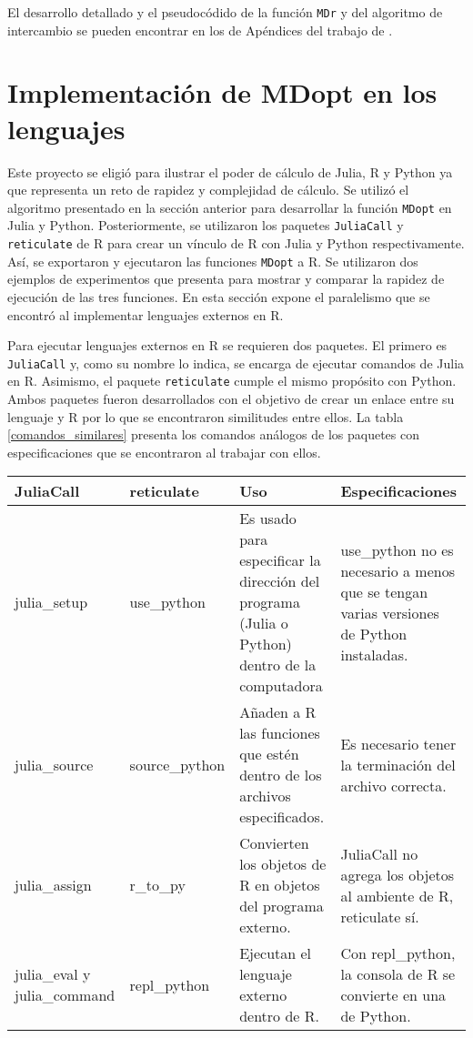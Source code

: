 El desarrollo detallado y el pseudocódido de la función \texttt{MDr} y del algoritmo de intercambio se pueden encontrar en los de Apéndices del trabajo de \cite{tesis_paty}.  

\section{Implementación de MDopt en los lenguajes}

Este proyecto se eligió para ilustrar el poder de cálculo de \textsf{Julia, R} y \textsf{Python} ya que representa un reto de rapidez y complejidad de cálculo. Se utilizó el algoritmo presentado en la sección anterior para desarrollar la función \texttt{MDopt} en \textsf{Julia} y \textsf{Python}. Posteriormente, se utilizaron los paquetes \texttt{JuliaCall} y \texttt{reticulate} de \textsf{R} para crear un vínculo de \textsf{R} con \textsf{Julia} y \textsf{Python} respectivamente. Así, se exportaron y ejecutaron las funciones \texttt{MDopt} a \textsf{R}. Se utilizaron dos ejemplos de experimentos que presenta \cite{Meyer} para mostrar y comparar la rapidez de ejecución de las tres funciones. En esta sección expone el paralelismo que se encontró al implementar lenguajes externos en \textsf{R}.

Para ejecutar lenguajes externos en \textsf{R} se requieren dos paquetes. El primero es \texttt{JuliaCall} y, como su nombre lo indica, se encarga de ejecutar comandos de \textsf{Julia} en \textsf{R}. Asimismo, el paquete \texttt{reticulate} cumple el mismo propósito con \textsf{Python}. Ambos paquetes fueron desarrollados con el objetivo de crear un enlace entre su lenguaje y \textsf{R} por lo que se encontraron similitudes entre ellos. La tabla \ref{comandos_similares} presenta los comandos análogos de los paquetes con especificaciones que se encontraron al trabajar con ellos. 

\begin{center}
	\begin{tabular}{ |p{2.5cm}|p{2.5cm}|p{3cm}|p{3cm}|  }
		JuliaCall & reticulate & Uso & Especificaciones\\
		\hline
		julia\_setup   & use\_python    & Es usado para especificar la dirección del programa (Julia o Python) dentro de la computadora &   use\_python no es necesario a menos que se tengan varias versiones de Python instaladas.\\
		\hline
		julia\_source &   source\_python  & Añaden a R las funciones que estén dentro de los archivos especificados.   & Es necesario tener la terminación del archivo correcta.\\
		\hline
		julia\_assign & r\_to\_py &  Convierten los objetos de R en objetos del programa externo. &  JuliaCall no agrega los objetos al ambiente de R, reticulate sí.\\
		\hline
		julia\_eval y julia\_command  & repl\_python\(\) & Ejecutan el lenguaje externo dentro de R. &  Con repl\_python, la consola de R se convierte en una de Python.\\
		\hline
	\end{tabular}
	 \label{comandos_similares}
\end{center}


